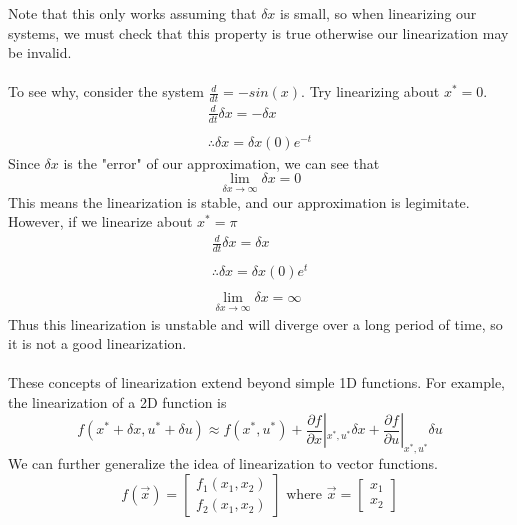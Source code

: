 \documentclass{article}
\begin{document}
Note that this only works assuming that $\delta x$ is small, so when linearizing our systems, 
we must check that this property is true otherwise our linearization may be invalid. 
\\\\To see why, consider the system $\frac{d}{dt}=-sin(x)$. Try linearizing about $x^*=0$.
\[
    \begin{array} {c}
        \frac{d}{dt}\delta x = -\delta x\\\\
        \therefore \delta x = \delta x(0)e^{-t}
    \end{array}
\]
Since $\delta x$ is the "error" of our approximation, we can see that
$$\lim_{\delta x \to \infty}{\delta x} = 0$$
This means the linearization is stable, and our approximation is legimitate.
However, if we linearize about $x^*=\pi$
\[
    \begin{array} {c}
        \frac{d}{dt}\delta x = \delta x\\\\
        \therefore \delta x = \delta x(0)e^{t}\\\\
        \lim_{\delta x \to \infty}{\delta x} = \infty
    \end{array}
\]
Thus this linearization is unstable and will diverge over a long period of time, so it is not a good linearization.
\\\\These concepts of linearization extend beyond simple 1D functions. For example, the linearization of a 2D function is
$$f(x^*+\delta x, u^*+\delta u) \approx f(x^*, u^*)+\frac{\partial f}{\partial x}|_{x^*, u^*}\delta x+\frac{\partial f}{\partial u}|_{x^*, u^*}\delta u$$
We can further generalize the idea of linearization to vector functions.
\[
    f(\vec{x})=\left[
        \begin{array}{c}
            f_1(x_1, x_2)\\
            f_2(x_1, x_2)
        \end{array}
        \right] \text{ where } \vec{x} = \left[
            \begin{array}{c}
                x_1\\
                x_2
            \end{array}
            \right]
    \]
\end{document}
